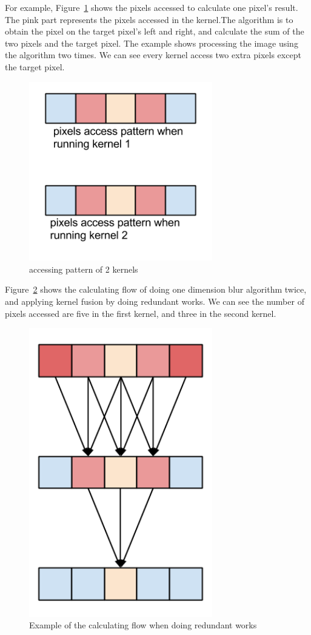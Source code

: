     For example, Figure~\ref{fig:my_label2} shows the pixels accessed to calculate one pixel’s result. The pink part represents the pixels accessed in the kernel.The algorithm is to obtain the pixel on the target pixel’s left and right, and calculate the sum of the two pixels and the target pixel. The example shows processing the image using the algorithm two times. We can see every kernel access two extra pixels except the target pixel.
	
\begin{figure}[hbtp]
\centering
\includegraphics[width=8cm]{img/figure2.png}
\caption{accessing pattern of 2 kernels}
\label{fig:my_label2}
\end{figure}

    Figure~\ref{fig:my_label3} shows the calculating flow of doing one dimension blur algorithm twice, and applying kernel fusion by doing redundant works. We can see the number of pixels accessed are five in the first kernel, and three in the second kernel.
	
\begin{figure}[hbtp]
\centering
\includegraphics[width=8cm]{img/figure3-6(for-paper).png}
\caption{Example of the calculating flow when doing redundant works}
\label{fig:my_label3}
\end{figure}
	
